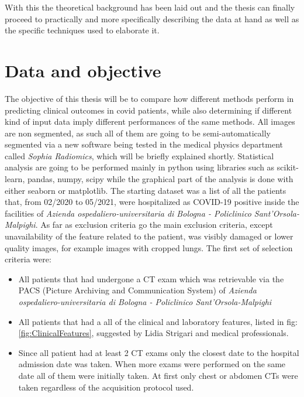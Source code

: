 With this the theoretical background has been laid out and the thesis can finally proceed to practically and more specifically describing the data at hand as well as the specific techniques used to elaborate it.


\section{Data and objective}
\label{chap:freefree}
The objective of this thesis will be to compare how different methods perform in predicting clinical outcomes in covid patients, while also determining if different kind of input data imply different performances of the same methods.
All images are non segmented, as such all of them are going to be semi-automatically segmented via a new software being tested in the medical physics department called \textit{Sophia Radiomics}, which will be briefly explained shortly. Statistical analysis are going to be performed mainly in python using libraries such as scikit-learn, pandas, numpy, scipy while the graphical part of the analysis is done with either seaborn or matplotlib.
The starting dataset was a list of all the patients that, from 02/2020 to 05/2021, were hospitalized as COVID-19 positive inside the facilities of \textit{Azienda ospedaliero-universitaria di Bologna - Policlinico Sant'Orsola-Malpighi}. As far as exclusion criteria go the main exclusion criteria, except unavailability of the feature related to the patient, was visibly damaged or lower quality images, for example images with cropped lungs. The first set of selection criteria were:

\begin{itemize}
\item All patients that had undergone a CT exam which was retrievable via the PACS (Picture Archiving and Communication System) of \textit{Azienda ospedaliero-universitaria di Bologna - Policlinico Sant'Orsola-Malpighi}
\item All patients that had a all of the clinical and laboratory features, listed in fig:\ref{fig:ClinicalFeatures}, suggested by Lidia Strigari and medical professionals.
\item Since all patient had at least 2 CT exams only the closest date to the hospital admission date was taken. When more exams were performed on the same date all of them were initially taken. At first only chest or abdomen CTs were taken regardless of the acquisition protocol used.
\end{itemize}


